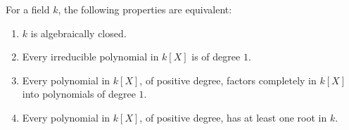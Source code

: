For a field $k$, the following properties are equivalent:

\begin{enumerate}
\item[(a)] $k$ is algebraically closed.
\item[(b)] Every irreducible polynomial in $k[X]$ is of degree $1$.
\item[(c)] Every polynomial in $k[X]$, of positive degree, factors completely in $k[X]$ into polynomials of degree $1$.
\item[(d)] Every polynomial in $k[X]$, of positive degree, has at least one root in $k$.
\end{enumerate}
